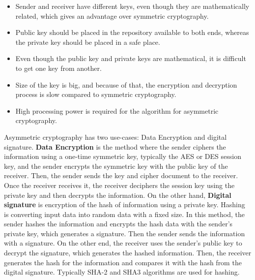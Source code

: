 \documentclass[12pt,a4paper]{article}
\begin{document}
\begin{itemize}

\item Sender and receiver have different keys, even though they are mathematically related, which gives an advantage over symmetric cryptography. \cite{r23}

\item Public key should be placed in the repository available to both ends, whereas the private key should be placed in a safe place. \cite{r23}

\item Even though the public key and private keys are mathematical, it is difficult to get one key from another. \cite{r23}

\item Size of the key is big, and because of that, the encryption and decryption process is slow compared to symmetric cryptography.  \cite{r23}

\item High processing power is required for the algorithm for asymmetric cryptography. \cite{r23}

\end{itemize}

Asymmetric cryptography has two use-cases: Data Encryption and digital signature. \textbf{Data Encryption} is the method where the sender ciphers the information using a one-time symmetric key, typically the AES or DES session key, and the sender encrypts the symmetric key with the public key of the receiver. Then, the sender sends the key and cipher document to the receiver. Once the receiver receives it, the receiver deciphers the session key using the private key and then decrypts the information. On the other hand, \textbf{Digital signature} is encryption of the hash of information using a private key. Hashing is converting input data into random data with a fixed size. In this method, the sender hashes the information and encrypts the hash data with the sender's private key, which generates a signature. Then the sender sends the information with a signature. On the other end, the receiver uses the sender's public key to decrypt the signature, which generates the hashed information. Then, the receiver generates the hash for the information and compares it with the hash from the digital signature. Typically SHA-2 and SHA3 algorithms are used for hashing. \cite{r23} \\
\end{document}
